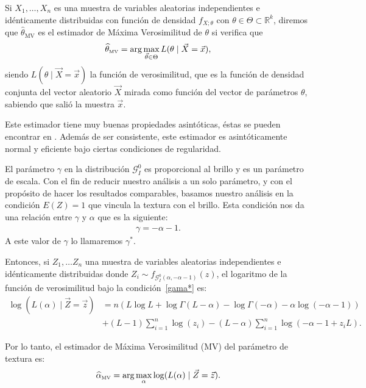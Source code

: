 \begin{definition}
Si $X_1, \ldots, X_n$ es una muestra de variables aleatorias independientes e idénticamente distribuidas con función de densidad $f_{X;\theta}$  con $\theta \in \Theta \subset \mathbb{R}^k$, diremos que $\widehat{\theta}_{\text{MV}}$ es el estimador de Máxima Verosimilitud de $\theta$ si verifica que 
\begin{align}
\widehat{\theta}_{{\text{\tiny{\text{MV}}}}}=\arg\max_{\vec{\theta} \in \Theta} L(\theta \mid \vec{X}=\vec{x}),
\end{align}
siendo $L(\theta \mid \vec{X}=\vec{x})$ la función de verosimilitud, que es la función de densidad conjunta del vector aleatorio $\vec{X}$ mirada como función del vector de parámetros $\theta$, sabiendo que salió la muestra $\vec{x}$.
\end{definition}
Este estimador tiene muy buenas propiedades asintóticas, éstas se pueden encontrar en  \citet{Casela2002}. 
Además de ser consistente, este estimador es asintóticamente normal y eficiente bajo ciertas condiciones de regularidad.

El parámetro $\gamma$ en la distribución $\mathcal{G}_I^0$  es proporcional al brillo y es un parámetro de escala. Con el fin de reducir nuestro análisis a un solo parámetro, y con el propósito de hacer los resultados comparables, basamos nuestro análisis en la condición $E(Z)=1$ que vincula la textura con el brillo. Esta condición nos da una relación entre $\gamma$ y $\alpha$ que es la siguiente:
\begin{align}
\label{gama*}
\gamma=-\alpha-1. 
\end{align}
A este valor de $\gamma$ lo llamaremos $\gamma^*$.

Entonces, si $Z_1,\ldots Z_n$ una muestra de variables aleatorias independientes e idénticamente distribuidas donde 
$Z_i \sim f_{\mathcal G_I^0(\alpha,-\alpha-1)}(z)$,  el logaritmo de la función de verosimilitud bajo la condición~\eqref{gama*} es:
\begin{align}
\nonumber \log (L(\alpha) \mid \vec{Z}=\vec{z})&=n(L \log L+\log \Gamma(L-\alpha)-\log \Gamma(-\alpha) -\alpha \log(-\alpha-1))\\
& + (L-1) \sum_{i=1}^n \log(z_i)-(L-\alpha) \sum_{i=1}^n\log(-\alpha-1+z_i L).
\end{align}


Por lo tanto, el estimador de Máxima Verosimilitud (MV) del parámetro de textura es:
\begin{align}
\widehat{\alpha}_{{\text{\tiny{MV}}}}=\arg\max_{\alpha} \log(L(\alpha)\mid \vec{Z}=\vec{z}).
\end{align}

